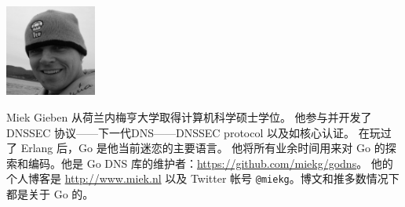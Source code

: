 \includegraphics[width=3cm]{fig/avatar-miekg-300x300}

Miek Gieben 从荷兰内梅亨大学取得计算机科学硕士学位。
他参与并开发了 DNSSEC 协议——下一代DNS——DNSSEC protocol 以及如核心认证\cite{RFC4641}。
在玩过了 Erlang 后，Go 是他当前迷恋的主要语言。
他将所有业余时间用来对 Go 的探索和编码。他是 Go DNS 库的维护者：\url{https://github.com/miekg/godns}。
他的个人博客是 \url{http://www.miek.nl} 以及 Twitter 帐号 \texttt{@miekg}。博文和推多数情况下都是关于 Go 的。
